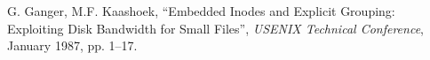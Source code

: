 \begin{thebibliography}{99}   

G. Ganger, M.F. Kaashoek,
``Embedded Inodes and Explicit Grouping: Exploiting Disk Bandwidth for Small Files'',
{\it USENIX Technical Conference},
January 1987, pp. 1--17.

\end{thebibliography}

